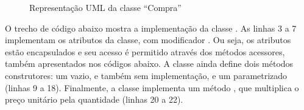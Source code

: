 \begin{figure}[h]
	\centering
	\caption{Representação UML da classe ``Compra''}
	\label{fig:classe-compra}
\end{figure}

O trecho de código abaixo mostra a implementação da classe . As linhas 3 a 7 implementam os atributos da classe, com modificador . Ou seja, os atributos estão encapsulados e seu acesso é permitido através dos métodos acessores, também apresentados nos códigos abaixo. A classe ainda define dois métodos construtores: um vazio, e também sem implementação, e um parametrizado (linhas 9 a 18). Finalmente, a classe implementa um método , que multiplica o preço unitário pela quantidade (linhas 20 a 22).

